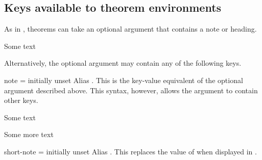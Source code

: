 \documentclass{ltxdoc}
\begin{document}
\subsection{Keys available to theorem environments} \label{in-doc-keys}

As in , theorems can take an optional argument that contains a note or heading.

\begin{keythmscode}[]
\begin{theorem}
Some text
\end{theorem}
\end{keythmscode}

Alternatively, the optional argument may contain any of the following keys.

\begin{docKey}{note}
  {=}
  {initially unset}
Alias . This is the key-value equivalent of the optional argument described above. This syntax, however, allows the argument to contain other keys.

\begin{keythmscode}[]
\begin{theorem}
Some text
\end{theorem}
\begin{theorem}[note=another heading]
Some more text
\end{theorem}
\end{keythmscode}

\end{docKey}

\begin{docKey}{short-note}
  {=}
  {initially unset}
Alias . This replaces the value of  when displayed in .
\end{docKey}

\end{document}
